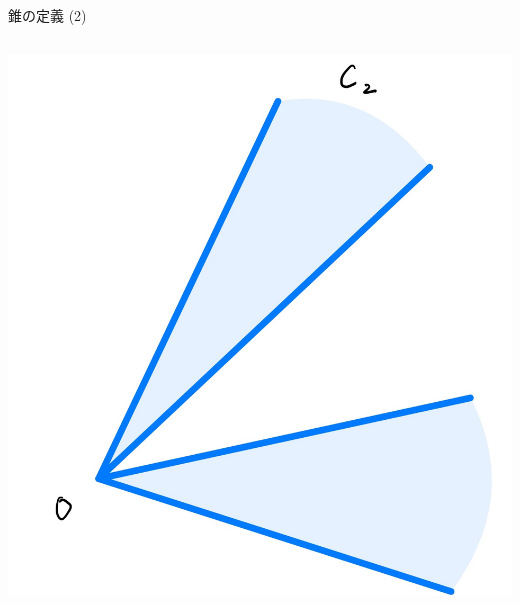 \documentclass[aspectratio=169, dvipdfmx, 11pt]{beamer} %
\begin{document}
\begin{frame}{錐の定義 (2) }
\begin{columns}
\begin{column}{0.48\textwidth}
      \includegraphics[keepaspectratio, scale=0.06]{figures/cone_figure_2.jpg}
    \end{column}
  \end{columns}
\end{frame}
\end{document}
